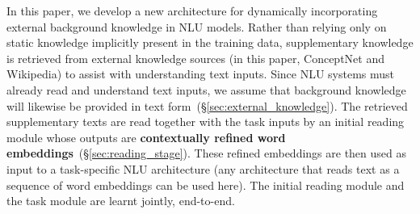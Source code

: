 \documentclass[11pt,a4paper]{article}
\newcommand{\dw}[1]{\textcolor{cyan}{\bf \small [#1 --DW]}}
\begin{document}
In this paper, we develop a new architecture for dynamically incorporating external background knowledge in NLU models. Rather than relying only on static knowledge implicitly present in the training data, supplementary knowledge is retrieved from external knowledge sources (in this paper, ConceptNet and Wikipedia) to assist with understanding text inputs. Since NLU systems must already read and understand text inputs, we assume that background knowledge will likewise be provided in text form~(\S\ref{sec:external_knowledge}).
The retrieved supplementary texts are read together with the task inputs by an initial reading module whose outputs are \textbf{contextually refined word embeddings}~(\S\ref{sec:reading_stage}). These refined embeddings are then used as input to a task-specific NLU architecture (any architecture that reads text as a sequence of word embeddings can be used here). The initial reading module and the task module are learnt jointly, end-to-end.

\end{document}
